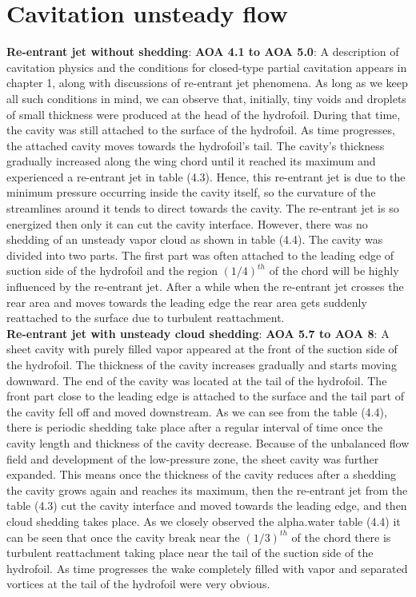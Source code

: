 \section{Cavitation unsteady flow}
\textbf{Re-entrant jet without shedding}:
 \textbf{AOA 4.1 to AOA 5.0}: A description of cavitation physics and the conditions for closed-type partial
cavitation appears in chapter 1, along with discussions of re-entrant jet phenomena. As long as we keep 
all such conditions in mind, we can observe that, initially, tiny voids and droplets of small thickness 
were produced at the head of the hydrofoil. During that time, the cavity was still attached to the surface 
of the hydrofoil. As time progresses, the attached cavity moves towards the hydrofoil's tail. The cavity's 
thickness gradually increased along the wing chord until it reached its maximum and experienced a re-entrant 
jet in table (4.3). Hence, this re-entrant jet is due to the minimum pressure occurring inside the cavity itself, 
so the curvature of the streamlines around it tends to direct towards the cavity. The re-entrant jet is so energized then only it can cut the cavity interface.
However, there was no shedding of an unsteady vapor cloud as shown in table (4.4). The cavity was divided into two parts. 
The first part was often attached to the leading edge of  suction side of the hydrofoil and the region ${(1/4)}^{th}$ of the chord will be highly 
influenced by the re-entrant jet. After a while when the re-entrant jet crosses the rear area and moves towards the leading edge 
the rear area gets suddenly reattached to the surface due to turbulent reattachment.\\
\textbf{Re-entrant jet with unsteady cloud shedding}:  
\textbf{AOA 5.7 to AOA 8}: A sheet cavity with purely filled vapor appeared at the front of the suction side of the hydrofoil. 
The thickness of the cavity increases gradually and starts moving downward. The end of the cavity 
was located at the tail of the hydrofoil. The front part close to the leading edge is attached to the surface and the 
tail part of the cavity fell off and moved downstream. As we can see from the table (4.4), there is periodic shedding take 
place after a regular interval of time once the cavity length and thickness of the cavity decrease. 
Because of the unbalanced flow field and development of the low-pressure zone, the sheet cavity was further expanded.
 This means once the thickness of the cavity reduces after a shedding the 
cavity grows again and reaches its maximum, then the re-entrant jet from the table (4.3) cut the cavity interface and 
moved towards the leading edge, and then cloud shedding takes place. As we closely observed the alpha.water table (4.4) it can be seen that once the cavity 
break near the $(1/3)^{th}$ of the chord there is turbulent reattachment taking place near the tail of the suction side of the hydrofoil.
As time progresses the wake completely filled with vapor and separated vortices at the tail of the hydrofoil were very obvious. 

